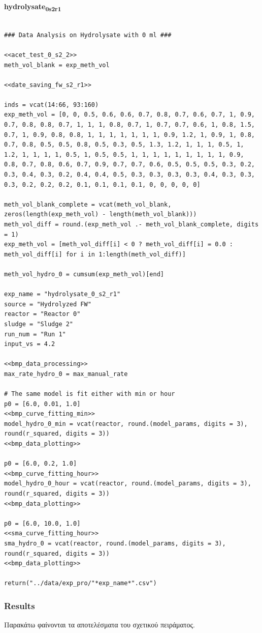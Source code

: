 \documentclass[11pt]{article}
\begin{document}
\textbf{hydrolysate\textsubscript{0}\textsubscript{s2}\textsubscript{r1}}
\begin{verbatim}

### Data Analysis on Hydrolysate with 0 ml ###

<<acet_test_0_s2_2>>
meth_vol_blank = exp_meth_vol

<<date_saving_fw_s2_r1>>

inds = vcat(14:66, 93:160)
exp_meth_vol = [0, 0, 0.5, 0.6, 0.6, 0.7, 0.8, 0.7, 0.6, 0.7, 1, 0.9, 0.7, 0.8, 0.8, 0.7, 1, 1, 1, 0.8, 0.7, 1, 0.7, 0.7, 0.6, 1, 0.8, 1.5, 0.7, 1, 0.9, 0.8, 0.8, 1, 1, 1, 1, 1, 1, 1, 0.9, 1.2, 1, 0.9, 1, 0.8, 0.7, 0.8, 0.5, 0.5, 0.8, 0.5, 0.3, 0.5, 1.3, 1.2, 1, 1, 1, 0.5, 1, 1.2, 1, 1, 1, 1, 0.5, 1, 0.5, 0.5, 1, 1, 1, 1, 1, 1, 1, 1, 1, 0.9, 0.8, 0.7, 0.8, 0.6, 0.7, 0.9, 0.7, 0.7, 0.6, 0.5, 0.5, 0.5, 0.3, 0.2, 0.3, 0.4, 0.3, 0.2, 0.4, 0.4, 0.5, 0.3, 0.3, 0.3, 0.3, 0.4, 0.3, 0.3, 0.3, 0.2, 0.2, 0.2, 0.1, 0.1, 0.1, 0.1, 0, 0, 0, 0, 0]

meth_vol_blank_complete = vcat(meth_vol_blank, zeros(length(exp_meth_vol) - length(meth_vol_blank)))
meth_vol_diff = round.(exp_meth_vol .- meth_vol_blank_complete, digits = 1)
exp_meth_vol = [meth_vol_diff[i] < 0 ? meth_vol_diff[i] = 0.0 : meth_vol_diff[i] for i in 1:length(meth_vol_diff)]

meth_vol_hydro_0 = cumsum(exp_meth_vol)[end]

exp_name = "hydrolysate_0_s2_r1"
source = "Hydrolyzed FW"
reactor = "Reactor 0"
sludge = "Sludge 2"
run_num = "Run 1"
input_vs = 4.2

<<bmp_data_processing>>
max_rate_hydro_0 = max_manual_rate

# The same model is fit either with min or hour
p0 = [6.0, 0.01, 1.0]
<<bmp_curve_fitting_min>>
model_hydro_0_min = vcat(reactor, round.(model_params, digits = 3), round(r_squared, digits = 3))
<<bmp_data_plotting>>

p0 = [6.0, 0.2, 1.0]
<<bmp_curve_fitting_hour>>
model_hydro_0_hour = vcat(reactor, round.(model_params, digits = 3), round(r_squared, digits = 3))
<<bmp_data_plotting>>

p0 = [6.0, 10.0, 1.0]
<<sma_curve_fitting_hour>>
sma_hydro_0 = vcat(reactor, round.(model_params, digits = 3), round(r_squared, digits = 3))
<<bmp_data_plotting>>

return("../data/exp_pro/"*exp_name*".csv")
\end{verbatim}

\subsubsection{Results}
\label{sec:org3dcd972}
Παρακάτω φαίνονται τα αποτελέσματα του σχετικού πειράματος.
\end{document}
